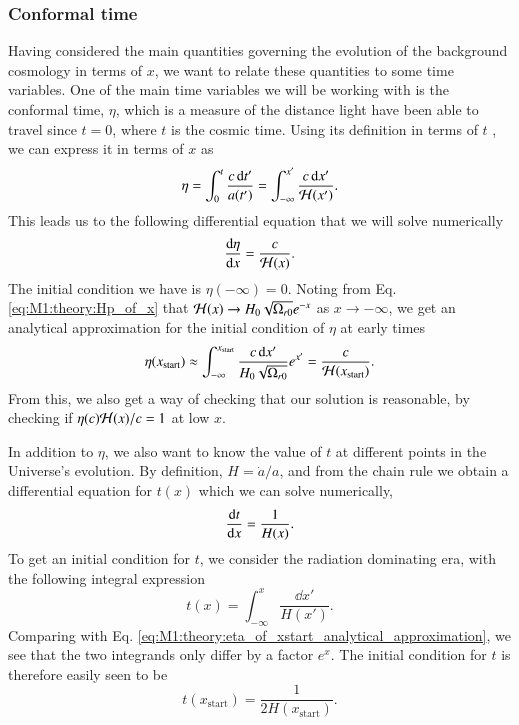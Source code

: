 \subsubsection{Conformal time}
Having considered the main quantities governing the evolution of the background cosmology in terms of $x$, we want to relate these quantities to some time variables. One of the main time variables we will be working with is the conformal time, $\eta$, which is a measure of the distance light have been able to travel since $t=0$, where $t$ is the cosmic time. Using its definition in terms of $t$ \cite[Eq. (2.90)]{Dodelson}, we can express it in terms of $x$ as 
\begin{equation}
    \eta = \int_0^t \frac{c \, \dd t'}{a(t')} = \int_{-\infty}^{x'} \frac{c\,\dd x'}{\mathcal{H}(x')}. \label{eq:M1:theory:eta_of_x_integral_expression}
\end{equation}
%
This leads us to the following differential equation that we will solve numerically 
\begin{equation}
    \dv{\eta}{x} = \frac{c}{\mathcal{H}(x)}. \label{eq:M1:theory:deta_dx}
\end{equation}
%
The initial condition we have is $\eta(-\infty)=0$. Noting from Eq. \eqref{eq:M1:theory:Hp_of_x} that $\mathcal{H}(x)\to H_0\sqrt{\Omega_{r0}}e^{-x}$ as $x\to-\infty$, we get an analytical approximation for the initial condition of $\eta$ at early times 
\begin{align}
    \eta(x_\mathrm{start}) \approx \int_{-\infty}^{x_\mathrm{start}} \frac{c\,\dd x'}{H_0\sqrt{\Omega_{r0}}} e^{x'} = \frac{c}{\mathcal{H}(x_\mathrm{start})}. \label{eq:M1:theory:eta_of_xstart_analytical_approximation}
\end{align} 
%
From this, we also get a way of checking that our solution is reasonable, by checking if $\eta(c)\mathcal{H}(x)/c=1$ at low $x$.    
% 

In addition to $\eta$, we also want to know the value of $t$ at different points in the Universe's evolution. By definition, $H=\dot{a}/a$, and from the chain rule we obtain a differential equation for $t(x)$ which we can solve numerically, 
\begin{equation}
    \dv{t}{x} = \frac{1}{H(x)}. \label{eq:M1:theory:cosmic_time_ODE}
\end{equation}
To get an initial condition for $t$, we consider the radiation dominating era, with the following integral expression 
\begin{equation}
    t(x) = \int_{-\infty}^x \frac{\dd x'}{H(x')}. \label{eq:M1:theory:t_of_x_integral_expression}
\end{equation} 
%
Comparing with Eq. \eqref{eq:M1:theory:eta_of_xstart_analytical_approximation}, we see that the two integrands only differ by a factor $e^x$. The initial condition for $t$ is therefore easily seen to be  
\begin{equation}
    t(x_\mathrm{start}) = \frac{1}{2H(x_\mathrm{start})}. \label{eq:M1:theory:t_of_xstart_analytical_approximation}
\end{equation} 


